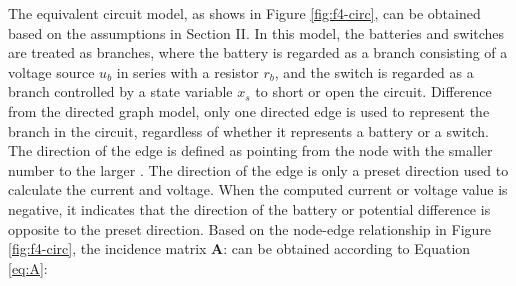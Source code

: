 \documentclass{article}
\begin{document}
The equivalent circuit model, as shows in Figure \ref{fig:f4-circ}, can be obtained based on the assumptions in Section II. 
In this model, the batteries and switches are treated as branches, where the battery is regarded as a branch consisting of a voltage source $u_b$ in series with a resistor $r_b$, and the switch is regarded as a branch controlled by a state variable $x_s$ to short or open the circuit.
Difference from the directed graph model, only one directed edge is used to represent the branch in the circuit, regardless of whether it represents a battery or a switch. 
The direction of the edge is defined as pointing from the node with the smaller number to the  larger . 
The direction of the edge is only a preset direction used to calculate the current and voltage. 
When the computed current or voltage value is negative, it indicates that the direction of the battery or potential difference is opposite to the preset direction. 
Based on the node-edge relationship in Figure \ref{fig:f4-circ}, the incidence matrix $\bm{A}$: can be obtained according to Equation \ref{eq:A}:
\end{document}
